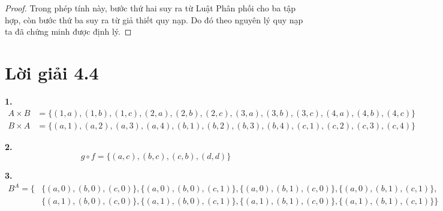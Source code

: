 \documentclass[12pt,a4paper]{article}
\theoremstyle{definition}
\begin{document}
\begin{itemize}
\begin{proof}
Trong phép tính này, bước thứ hai suy ra từ Luật Phân phối cho ba tập hợp, còn bước thứ ba suy ra từ giả thiết quy nạp. Do đó theo nguyên lý quy nạp ta đã chứng minh được định lý.
\end{proof}
\end{itemize}

\section*{Lời giải 4.4}

\textbf{1.}
\begin{align*}
A \times B &= \{(1,a), (1,b), (1,c), (2,a), (2,b), (2,c), (3,a), (3,b), (3,c), (4,a), (4,b), (4,c)\}\\
B \times A &= \{(a,1), (a,2), (a,3), (a,4), (b,1), (b,2), (b,3), (b,4), (c,1), (c,2), (c,3), (c,4)\}
\end{align*}

\bigskip
\textbf{2.}
\[g \circ f = \{(a, c), (b, c), (c, b), (d, d)\}\]

\bigskip
\textbf{3.}
\begin{align*}
B^A = \{&\{(a,0),(b,0),(c,0)\}, \{(a,0),(b,0),(c,1)\}, \{(a,0),(b,1),(c,0)\}, \{(a,0),(b,1),(c,1)\},\\
&\{(a,1),(b,0),(c,0)\}, \{(a,1),(b,0),(c,1)\}, \{(a,1),(b,1),(c,0)\}, \{(a,1),(b,1),(c,1)\}\}
\end{align*}
\end{document}
